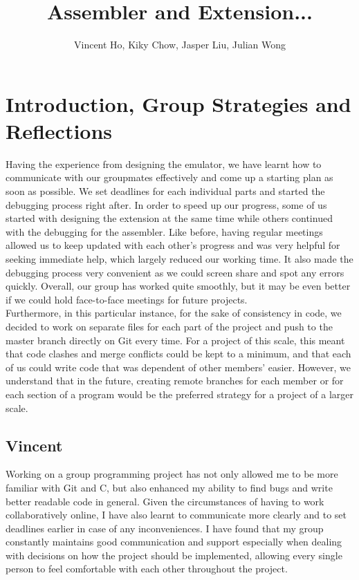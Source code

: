 \documentclass[11pt]{article}
\title{Assembler and Extension... }
\author{Vincent Ho, Kiky Chow, Jasper Liu, Julian Wong}
\begin{document}
\maketitle

\section{Introduction, Group Strategies and Reflections}

Having the experience from designing the emulator, we have learnt how to communicate with our groupmates effectively and come up a starting plan as soon as possible. We set deadlines for each individual parts and started the debugging process right after. In order to speed up our progress, some of us started with designing the extension at the same time while others continued with the debugging for the assembler. Like before, having regular meetings allowed us to keep updated with each other’s progress and was very helpful for seeking immediate help, which largely reduced our working time. It also made the debugging process very convenient as we could screen share and spot any errors quickly. Overall, our group has worked quite smoothly, but it may be even better if we could hold face-to-face meetings for future projects.\\

Furthermore, in this particular instance, for the sake of consistency in code, we decided to work on separate files for each part of the project and push to the master branch directly on Git every time. For a project of this scale, this meant that code clashes and merge conflicts could be kept to a minimum, and that each of us could write code that was dependent of other members' easier. However, we understand that in the future, creating remote branches for each member or for each section of a program would be the preferred strategy for a project of a larger scale.

\subsection{Vincent}

Working on a group programming project has not only allowed me to be more familiar with Git and C, but also enhanced my ability to find bugs and write better readable code in general. Given the circumstances of having to work collaboratively online, I have also learnt to communicate more clearly and to set deadlines earlier in case of any inconveniences. I have found that my group constantly maintains good communication and support especially when dealing with decisions on how the project should be implemented, allowing every single person to feel comfortable with each other throughout the project.\\
\end{document}
